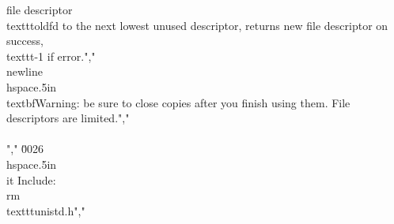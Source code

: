 file descriptor \\texttt{oldfd} to the next lowest unused descriptor, returns new file descriptor on success, \\texttt{-1} if error.","    \\newline\\hspace{.5in}\\textbf{Warning:} be sure to close copies after you finish using them. File descriptors are limited.","        \\\\","    \u0026 \\hspace{.5in}\\it Include: \\rm\\texttt{unistd.h}","        %